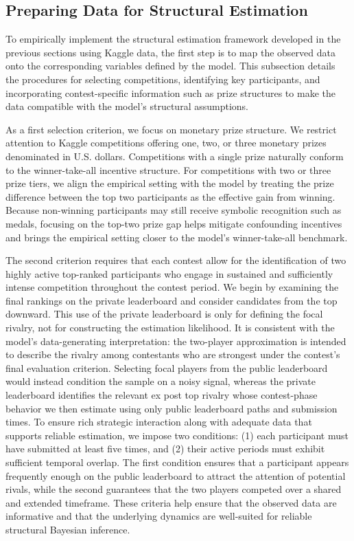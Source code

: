 \documentclass[mnsc]{informs3}
\begin{document}
\subsection{Preparing Data for Structural Estimation}
\label{sec-data-clean}

To empirically implement the structural estimation framework developed in the previous sections using Kaggle data, the first step is to map the observed data onto the corresponding variables defined by the model.
This subsection details the procedures for selecting competitions, identifying key participants, and incorporating contest-specific information such as prize structures to make the data compatible with the model’s structural assumptions.

As a first selection criterion, we focus on monetary prize structure.
We restrict attention to Kaggle competitions offering one, two, or three monetary prizes denominated in U.S. dollars.
Competitions with a single prize naturally conform to the winner-take-all incentive structure.
For competitions with two or three prize tiers, we align the empirical setting with the model by treating the prize difference between the top two participants as the effective gain from winning.
Because non-winning participants may still receive symbolic recognition such as medals, focusing on the top-two prize gap helps mitigate confounding incentives and brings the empirical setting closer to the model’s winner-take-all benchmark.

The second criterion requires that each contest allow for the identification of two highly active top-ranked participants who engage in sustained and sufficiently intense competition throughout the contest period.
We begin by examining the final rankings on the private leaderboard and consider candidates from the top downward.
This use of the private leaderboard is only for defining the focal rivalry, not for constructing the estimation likelihood.
It is consistent with the model's data-generating interpretation: the two-player approximation is intended to describe the rivalry among contestants who are strongest under the contest's final evaluation criterion.
Selecting focal players from the public leaderboard would instead condition the sample on a noisy signal, whereas the private leaderboard identifies the relevant ex post top rivalry whose contest-phase behavior we then estimate using only public leaderboard paths and submission times.
To ensure rich strategic interaction along with adequate data that supports reliable estimation, we impose two conditions: (1) each participant must have submitted at least five times, and (2) their active periods must exhibit sufficient temporal overlap.
The first condition ensures that a participant appears frequently enough on the public leaderboard to attract the attention of potential rivals, while the second guarantees that the two players competed over a shared and extended timeframe.
These criteria help ensure that the observed data are informative and that the underlying dynamics are well-suited for reliable structural Bayesian inference.
\end{document}
